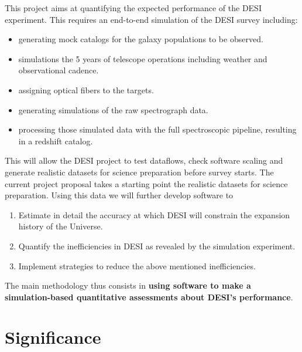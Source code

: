 \documentclass[12pt]{article}
\begin{document}
This project aims at quantifying the expected performance of the DESI
experiment. 
This requires an end-to-end simulation of the DESI survey including:
\begin{itemize}
\item generating mock catalogs for the galaxy populations to be
  observed.
\item simulations the 5 years of telescope operations including
  weather and observational cadence.
\item assigning optical fibers to the targets.
\item generating simulations of the raw spectrograph data.
\item processing those simulated data with the full spectroscopic
  pipeline, resulting in a redshift catalog.
\end{itemize}

This will allow the DESI project to test dataflows, check software
scaling  and generate realistic datasets for science preparation before
survey starts. The current project proposal takes a starting point the
realistic datasets for science preparation. Using this data we will
further develop software to  
\begin{enumerate}
\item Estimate in detail the accuracy at which DESI will constrain the
  expansion history of the Universe.
\item Quantify the inefficiencies in DESI as revealed by the
  simulation experiment.
\item Implement strategies to reduce the above mentioned inefficiencies. 
\end{enumerate}

The main methodology thus consists in {\bf using software to make a
simulation-based quantitative assessments about DESI's performance}. 

\section*{Significance}
\end{document}

